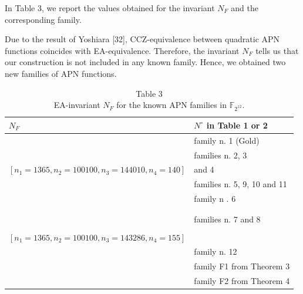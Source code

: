 \documentclass[10pt]{article}
\begin{document}
In Table 3, we report the values obtained for the invariant $N_{F}$ and the corresponding family.

Due to the result of Yoshiara [32], CCZ-equivalence between quadratic APN functions coincides with EA-equivalence. Therefore, the invariant $N_{F}$ tells us that our construction is not included in any known family. Hence, we obtained two new families of APN functions.

\begin{table}[h]
\begin{center}
\captionsetup{labelformat=empty}
\caption{Table 3\\
EA-invariant $N_{F}$ for the known APN families in $\mathbb{F}_{2^{12}}$.}
\begin{tabular}{|l|l|}
\hline
$N_{F}$ & $N^{\circ}$ in Table 1 or 2 \\
\hline
[ $n_{1}=1365, n_{2}=100100, n_{3}=99840, n_{4}=91$ ] & family n. 1 (Gold) \\
\hline
[ $n_{1}=1365, n_{2}=100100, n_{3}=141700$ ] & families n. 2, 3 \\
\hline
$\left[n_{1}=1365, n_{2}=100100, n_{3}=144010, n_{4}=140\right]$ & and 4 \\
\hline
[ $n_{1}=1365, n_{2}=100100, n_{3}=142932$ ] & families n. 5, 9, 10 and 11 \\
\hline
[ $n_{1}=1365, n_{2}=100100, n_{3}=139980, n_{4}=152$ ] & family n . 6 \\
\hline
[ $n_{1}=1365, n_{2}=100100, n_{3}=138918, n_{4}=103$ ] &  \\
\hline
[ $n_{1}=1365, n_{2}=100100, n_{3}=144728, n_{4}=184$ ] &  \\
\hline
[ $n_{1}=1365, n_{2}=100100, n_{3}=143502, n_{4}=198$ ] & families n. 7 and 8 \\
\hline
[ $n_{1}=1365, n_{2}=100100, n_{3}=144584, n_{4}=229$ ] &  \\
\hline
$\left[n_{1}=1365, n_{2}=100100, n_{3}=143286, n_{4}=155\right]$ &  \\
\hline
[ $n_{1}=1365, n_{2}=100100, n_{3}=144759, n_{4}=126$ ] & family n. 12 \\
\hline
[ $n_{1}=1365, n_{2}=100100, n_{3}=140664$ ] & family F1 from Theorem 3 \\
\hline
[ $n_{1}=1365, n_{2}=100100, n_{3}=144198, n_{4}=192$ ] & family F2 from Theorem 4 \\
\hline
\end{tabular}
\end{center}
\end{table}
\end{document}
